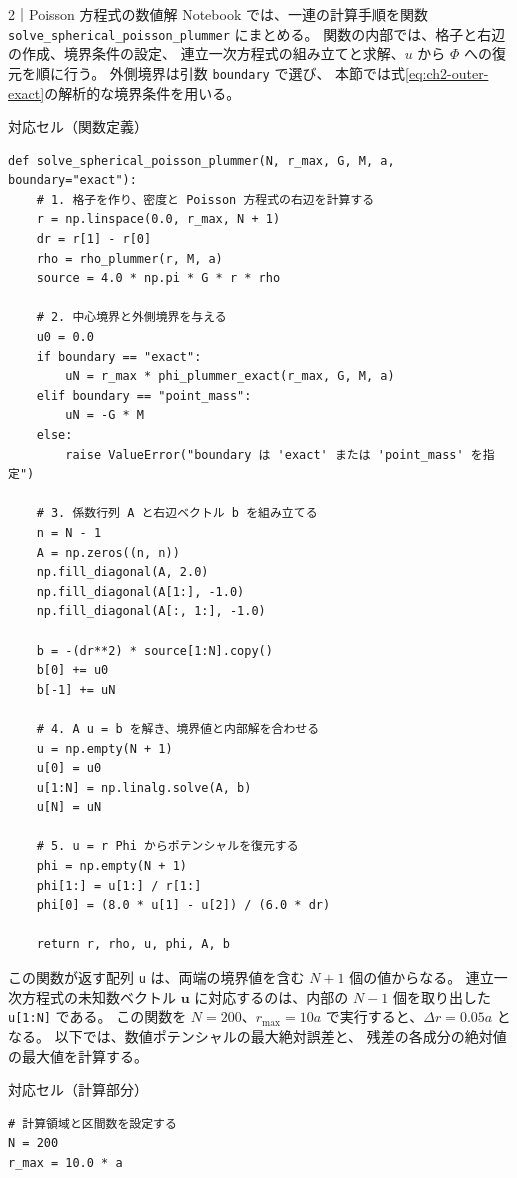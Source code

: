\begin{notebookblock}{2｜Poisson 方程式の数値解}
Notebook では、一連の計算手順を関数
\texttt{solve\_\allowbreak spherical\_\allowbreak poisson\_\allowbreak plummer} にまとめる。
関数の内部では、格子と右辺の作成、境界条件の設定、
連立一次方程式の組み立てと求解、$u$ から $\Phi$ への復元を順に行う。
外側境界は引数 \texttt{boundary} で選び、
本節では式\eqref{eq:ch2-outer-exact}の解析的な境界条件を用いる。

{\sffamily\small\color{graytext}対応セル（関数定義）}
\begin{Verbatim}[xleftmargin=2mm,fontsize=\small,frame=single,framesep=1.8mm,framerule=0.35pt,rulecolor=\color{listingframe},fillcolor=\color{listingbg}]
def solve_spherical_poisson_plummer(N, r_max, G, M, a, boundary="exact"):
    # 1. 格子を作り、密度と Poisson 方程式の右辺を計算する
    r = np.linspace(0.0, r_max, N + 1)
    dr = r[1] - r[0]
    rho = rho_plummer(r, M, a)
    source = 4.0 * np.pi * G * r * rho

    # 2. 中心境界と外側境界を与える
    u0 = 0.0
    if boundary == "exact":
        uN = r_max * phi_plummer_exact(r_max, G, M, a)
    elif boundary == "point_mass":
        uN = -G * M
    else:
        raise ValueError("boundary は 'exact' または 'point_mass' を指定")

    # 3. 係数行列 A と右辺ベクトル b を組み立てる
    n = N - 1
    A = np.zeros((n, n))
    np.fill_diagonal(A, 2.0)
    np.fill_diagonal(A[1:], -1.0)
    np.fill_diagonal(A[:, 1:], -1.0)

    b = -(dr**2) * source[1:N].copy()
    b[0] += u0
    b[-1] += uN

    # 4. A u = b を解き、境界値と内部解を合わせる
    u = np.empty(N + 1)
    u[0] = u0
    u[1:N] = np.linalg.solve(A, b)
    u[N] = uN

    # 5. u = r Phi からポテンシャルを復元する
    phi = np.empty(N + 1)
    phi[1:] = u[1:] / r[1:]
    phi[0] = (8.0 * u[1] - u[2]) / (6.0 * dr)

    return r, rho, u, phi, A, b
\end{Verbatim}

この関数が返す配列 \texttt{u} は、両端の境界値を含む $N+1$ 個の値からなる。
連立一次方程式の未知数ベクトル $\boldsymbol{u}$ に対応するのは、内部の $N-1$ 個を取り出した \texttt{u[1:N]} である。
この関数を $N=200$、$r_{\max}=10a$ で実行すると、$\Delta r=0.05a$ となる。
以下では、数値ポテンシャルの最大絶対誤差と、
残差の各成分の絶対値の最大値を計算する。

{\sffamily\small\color{graytext}対応セル（計算部分）}
\begin{Verbatim}[xleftmargin=2mm,fontsize=\small,frame=single,framesep=1.8mm,framerule=0.35pt,rulecolor=\color{listingframe},fillcolor=\color{listingbg}]
# 計算領域と区間数を設定する
N = 200
r_max = 10.0 * a


\end{Verbatim}
\end{notebookblock}
